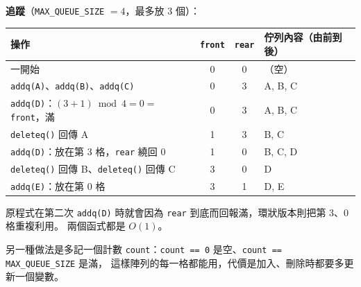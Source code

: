 \begin{pastsoln}
\textbf{追蹤}（\texttt{MAX\_QUEUE\_SIZE} $= 4$，最多放 $3$ 個）：
\begin{center}
\begin{tabular}{lccl}
\toprule
操作 & \texttt{front} & \texttt{rear} & 佇列內容（由前到後） \\
\midrule
一開始 & 0 & 0 & （空） \\
\texttt{addq(A)}、\texttt{addq(B)}、\texttt{addq(C)} & 0 & 3 & A, B, C \\
\texttt{addq(D)}：$(3 + 1) \bmod 4 = 0 =$ \texttt{front}，滿 & 0 & 3 & A, B, C \\
\texttt{deleteq()} 回傳 A & 1 & 3 & B, C \\
\texttt{addq(D)}：放在第 3 格，\texttt{rear} 繞回 $0$ & 1 & 0 & B, C, D \\
\texttt{deleteq()} 回傳 B、\texttt{deleteq()} 回傳 C & 3 & 0 & D \\
\texttt{addq(E)}：放在第 0 格 & 3 & 1 & D, E \\
\bottomrule
\end{tabular}
\end{center}
原程式在第二次 \texttt{addq(D)} 時就會因為 \texttt{rear} 到底而回報滿，環狀版本則把第 $3$、$0$ 格重複利用。
兩個函式都是 $O(1)$。

另一種做法是多記一個計數 \texttt{count}：\texttt{count == 0} 是空、\texttt{count == MAX\_QUEUE\_SIZE} 是滿，
這樣陣列的每一格都能用，代價是加入、刪除時都要多更新一個變數。
\end{pastsoln}
